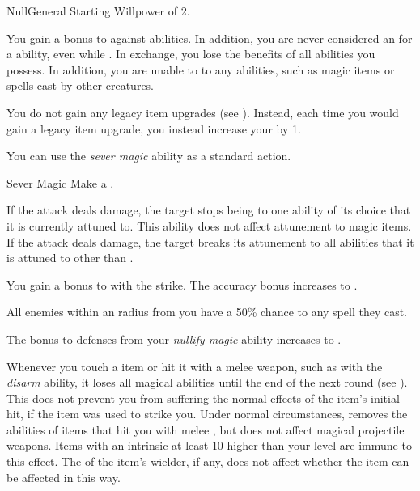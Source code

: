     \begin{feat}{Null}{General}
        \featpre Starting Willpower of 2.

         You gain a  bonus to  against  abilities.
        In addition, you are never considered an  for a  ability, even while .
        In exchange, you lose the benefits of all  abilities you possess.
        In addition, you are unable to  to any  abilities, such as magic items or spells cast by other creatures.

         You do not gain any legacy item upgrades (see ).
        Instead, each time you would gain a legacy item upgrade, you instead increase your  by 1.

         You can use the \textit{sever magic} ability as a standard action.
        \begin{freeability}{Sever Magic}
            Make a .

            \hit If the attack deals damage, the target stops being  to one ability of its choice that it is currently attuned to.
            This ability does not affect attunement to magic items.
            \crit If the attack deals damage, the target breaks its attunement to all abilities that it is attuned to other than .

            \rankline
             You gain a  bonus to  with the strike.
             The accuracy bonus increases to .
        \end{freeability}

         All enemies within an \areamed radius from you have a 50\% chance to  any spell they cast.

         The bonus to defenses from your \textit{nullify magic} ability increases to .

         Whenever you touch a  item or hit it with a melee weapon, such as with the \textit{disarm} ability, it loses all magical abilities until the end of the next round (see ).
        This does not prevent you from suffering the normal effects of the item's initial hit, if the item was used to strike you.
        Under normal circumstances, removes the abilities of items that hit you with melee , but does not affect magical projectile weapons.
        Items with an intrinsic  at least 10 higher than your level are immune to this effect.
        The  of the item's wielder, if any, does not affect whether the item can be affected in this way.


\end{feat}
